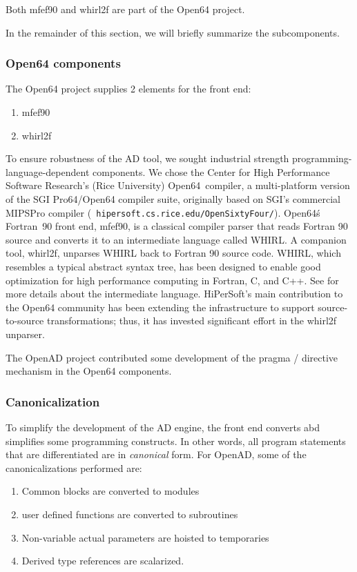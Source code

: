 \documentclass[acmtocl,acmnow]{acmtrans2m}
\newcommand{\OpenSixtyFour}{Open64}
\begin{document}
Both mfef90 and whirl2f are part of the Open64 project.

In the remainder of this section, we will briefly summarize the
subcomponents.

\subsubsection*{Open64 components}
The Open64 project supplies 2 elements for the front end:
   \begin{enumerate}
      \item mfef90
      \item whirl2f
   \end{enumerate}

To ensure robustness of the AD tool, we sought industrial strength
programming-language-dependent components.  We chose the Center for
High Performance Software Research's (Rice University) \OpenSixtyFour\
compiler, a multi-platform version of the SGI Pro64/Open64 compiler
suite, originally based on SGI's commercial MIPSPro compiler ({\tt
hipersoft.cs.rice.edu/OpenSixtyFour/}).  \OpenSixtyFour\'s Fortran~90
front end, mfef90, is a classical compiler parser that reads Fortran
90 source and converts it to an intermediate language called WHIRL.  A
companion tool, whirl2f, unparses WHIRL back to Fortran 90 source
code.  WHIRL, which resembles a typical abstract syntax tree, has been
designed to enable good optimization for high performance computing in
Fortran, C, and C++. See \cite{whirl-stuff} for more details about the
intermediate language. HiPerSoft's main contribution to the Open64
community has been extending the infrastructure to support
source-to-source transformations; thus, it has invested significant
effort in the whirl2f unparser.

The OpenAD project contributed some development of the pragma /
directive mechanism in the Open64 components.

\subsubsection*{Canonicalization}\label{sssec:Canonicalization}
To simplify the development of the AD engine, the front end converts
abd simplifies some programming constructs. In other words, all
program statements that are differentiated are in \emph{canonical}
form. For OpenAD, some of the canonicalizations performed are:

   \begin{enumerate}
      \item Common blocks are converted to modules
      \item user defined functions are converted to subroutines
      \item Non-variable actual parameters are hoisted to
            temporaries
      \item Derived type references are scalarized.
   \end{enumerate}
\end{document}
